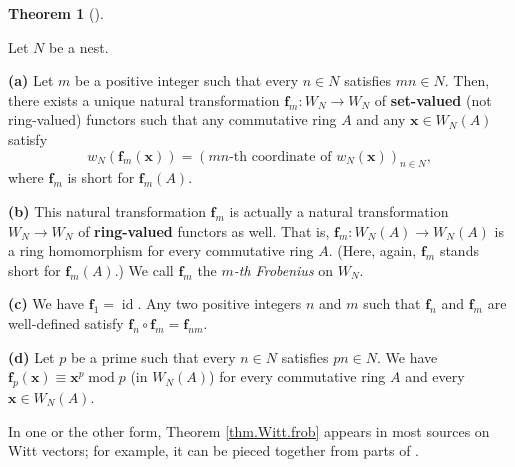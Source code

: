 \documentclass[numbers=enddot,12pt,final,onecolumn,notitlepage]{scrartcl}%
\theoremstyle{definition}
\newtheorem{theo}{Theorem}[section]
\newenvironment{theorem}[1][]
{\begin{theo}[#1]\begin{leftbar}}
{\end{leftbar}\end{theo}}
\newenvironment{noncompile}{}{}
\begin{document}
\begin{theorem}
\label{thm.Witt.frob}Let $N$ be a nest.

\textbf{(a)} Let $m$ be a positive integer such that every $n\in N$ satisfies
$mn\in N$. Then, there exists a unique natural transformation $\mathbf{f}%
_{m}:W_{N}\rightarrow W_{N}$ of \textbf{set-valued} (not ring-valued) functors
such that any commutative ring $A$ and any $\mathbf{x}\in W_{N}\left(
A\right)  $ satisfy%
\[
w_{N}\left(  \mathbf{f}_{m}\left(  \mathbf{x}\right)  \right)  =\left(
mn\text{-th coordinate of }w_{N}\left(  \mathbf{x}\right)  \right)  _{n\in
N},
\]
where $\mathbf{f}_{m}$ is short for $\mathbf{f}_{m}\left(  A\right)  $.

\textbf{(b)} This natural transformation $\mathbf{f}_{m}$ is actually a
natural transformation $W_{N}\rightarrow W_{N}$ of \textbf{ring-valued}
functors as well. That is, $\mathbf{f}_{m}:W_{N}\left(  A\right)  \rightarrow
W_{N}\left(  A\right)  $ is a ring homomorphism for every commutative ring
$A$. (Here, again, $\mathbf{f}_{m}$ stands short for $\mathbf{f}_{m}\left(
A\right)  $.) We call $\mathbf{f}_{m}$ the $m$\textit{-th Frobenius} on
$W_{N}$.

\textbf{(c)} We have $\mathbf{f}_{1}=\operatorname*{id}$. Any two positive
integers $n$ and $m$ such that $\mathbf{f}_{n}$ and $\mathbf{f}_{m}$ are
well-defined satisfy $\mathbf{f}_{n}\circ\mathbf{f}_{m}=\mathbf{f}_{nm}$.

\textbf{(d)} Let $p$ be a prime such that every $n\in N$ satisfies $pn\in N$.
We have $\mathbf{f}_{p}\left(  \mathbf{x}\right)  \equiv\mathbf{x}%
^{p}\operatorname{mod}p$ (in $W_{N}\left(  A\right)  $) for every commutative
ring $A$ and every $\mathbf{x}\in W_{N}\left(  A\right)  $.
\end{theorem}

In one or the other form, Theorem \ref{thm.Witt.frob} appears in most sources
on Witt vectors; for example, it can be pieced together from parts of
\cite[Theorem 5.7, Proposition 5.9 and Proposition 5.12]{rabinoff-witt}.

\begin{noncompile}
[By the way, what if we loosen the \textquotedblleft$n\in N\Longrightarrow
mn\in N$\textquotedblright\ condition in Theorem \ref{thm.Witt.frob}? I feel
we should get something like partial Frobenii $\mathbf{f}_{m}:W_{N}\left(
A\right)  \rightarrow W_{N/m}\left(  A\right)  $, where $N/m=\left\{
k\in\mathbb{N}_{+}\ \mid\ mk\in N\right\}  $.]
\end{noncompile}
\end{document}
